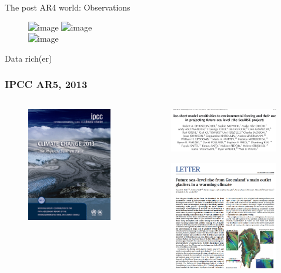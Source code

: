 \documentclass[hide notes,intlimits]{beamer}
\begin{document}
\begin{frame}{The post AR4 world: Observations}
  \begin{figure}
    \includegraphics<1>[height=3cm]{grace-satellites} \vspace{0.5em}
    \includegraphics<1>[height=3cm]{sentinel-satellites}
    \\[.5em]
    \includegraphics<1>[height=3cm]{oib}
  \end{figure}
  Data rich(er)
\end{frame}


\begin{frame}
  \frametitle{IPCC AR5, 2013}
  \begin{columns}[c]
    \begin{column}{.4\linewidth}
      \begin{figure}
        \includegraphics[height=5cm]{ar5-wg1}
      \end{figure}
    \end{column}
    \begin{column}{.6\linewidth}
      \begin{figure}
        \includegraphics[width=4.75cm]{searise}
      \end{figure}
      \begin{figure}
        \includegraphics[width=4.75cm]{nick2013}
      \end{figure}
    \end{column}
  \end{columns}
\end{frame}
\end{document}
